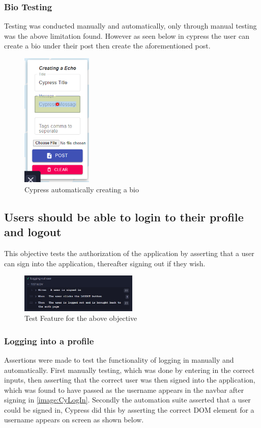 \subsubsection{Bio Testing}
Testing was conducted manually and automatically, only through manual testing was the above limitation found. However as seen below in cypress the user can create a bio under their post then create the aforementioned post.

\begin{figure}[h!]
    \centering
    \includegraphics[width=0.3\textwidth]{images/MessageAuto.png}
    \caption{Cypress automatically creating a bio}
    \label{image:MessageAuto}
\end{figure}

\subsection{Users should be able to login to their profile and logout}
This objective tests the authorization of the application by asserting that a user can sign into the application, thereafter signing out if they wish.

\begin{figure}[h!]
    \centering
    \includegraphics[width=0.5\textwidth]{images/LogInandOut.png}
    \caption{Test Feature for the above objective}
    \label{image:LogInandOut}
\end{figure}

\subsubsection{Logging into a profile}
Assertions were made to test the functionality of logging in manually and automatically. First manually testing, which was done by entering in the correct inputs, then asserting that the correct user was then signed into the application, which was found to have passed as the username appears in the navbar after signing in \ref{image:CyLogIn}. Secondly the automation suite asserted that a user could be signed in, Cypress did this by asserting the correct DOM element for a username appears on screen as shown below.

